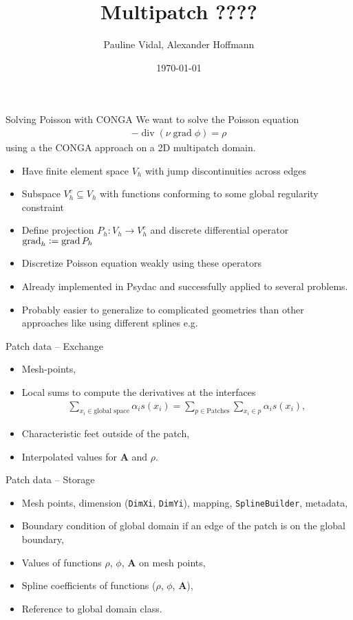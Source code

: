 \documentclass[
	english,%
	logo=false,%
	eurofusion=false, %
	titlegraphic=true, %
	]{ippbeamer}
\title{Multipatch ????}
\author{Pauline Vidal, Alexander Hoffmann}
\date{\today}
\DeclareMathOperator{\grad}{grad}
\DeclareMathOperator{\diver}{div}
\begin{document}
\frame{\titlepage}
\begin{frame}{Solving Poisson with CONGA}
	We want to solve the Poisson equation
	\begin{align*}
		-\diver (\nu \grad \phi) = \rho
	\end{align*}
	using a the CONGA approach on a 2D multipatch domain. 
	\begin{itemize}
		\item Have finite element space $V_h$ with jump discontinuities across edges
		\item Subspace $V_h^c \subseteq V_h$ with functions conforming to some global
				regularity constraint
		\item Define projection $P_h: V_h \rightarrow V_h^c$
				and discrete differential operator $\grad_h \vcentcolon= \grad P_h$
		\item Discretize Poisson equation weakly using these operators
	\end{itemize}
	\begin{alertblock}{}
		\begin{itemize}
			\item Already implemented in Psydac and successfully applied to several problems. 
			\item Probably easier to generalize to complicated geometries than other approaches
					like using different splines e.g.
		\end{itemize}
	\end{alertblock}
\end{frame}

\begin{frame}{Patch data -- Exchange}
	\begin{itemize}
		\item Mesh-points,
		\item Local sums to compute the derivatives at the interfaces
				\begin{align*}
					\sum_{x_i \in \text{global space}} \alpha_i s(x_i) = \sum_{p \in\text{Patches}} 
							\sum_{x_i \in p} \alpha_i s(x_i),
				\end{align*}
		\item Characteristic feet outside of the patch,
		\item Interpolated values for $\mathbf{A}$ and $\rho$.
	\end{itemize}
\end{frame}
\begin{frame}{Patch data -- Storage}
	\begin{itemize}
		\item Mesh points, dimension (\texttt{DimXi}, \texttt{DimYi}), mapping,
				\texttt{SplineBuilder}, metadata, 
		\item Boundary condition of global domain if an edge of the patch is on the global boundary,
		\item Values of functions $\rho$, $\phi$, $\mathbf{A}$ on mesh points,
		\item Spline coefficients of functions ($\rho$, $\phi$, $\mathbf{A}$),
		\item Reference to global domain class.
	\end{itemize}
\end{frame}
\end{document}
